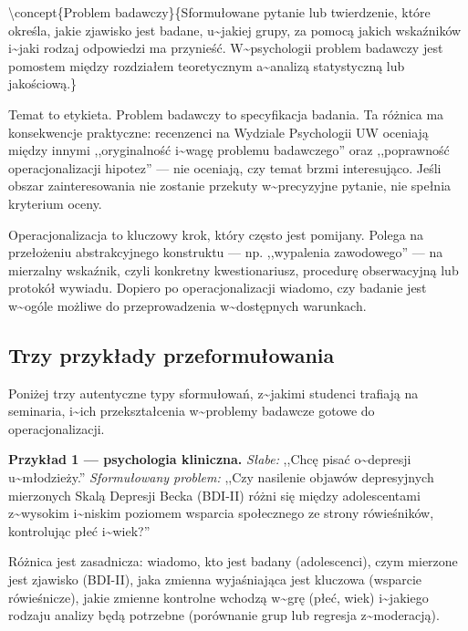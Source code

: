 \documentclass[12pt,a4paper,twoside,openany]{book}
\begin{document}
\textbackslash{}concept\{Problem badawczy\}\{Sformułowane pytanie lub twierdzenie, które określa, jakie zjawisko jest badane, u\textasciitilde{}jakiej grupy, za pomocą jakich wskaźników i\textasciitilde{}jaki rodzaj odpowiedzi ma przynieść. W\textasciitilde{}psychologii problem badawczy jest pomostem między rozdziałem teoretycznym a\textasciitilde{}analizą statystyczną lub jakościową.\}


Temat to etykieta. Problem badawczy to specyfikacja badania. Ta różnica ma konsekwencje praktyczne: recenzenci na Wydziale Psychologii UW oceniają między innymi ,,oryginalność i\textasciitilde{}wagę problemu badawczego'' oraz ,,poprawność operacjonalizacji hipotez'' --- nie oceniają, czy temat brzmi interesująco. Jeśli obszar zainteresowania nie zostanie przekuty w\textasciitilde{}precyzyjne pytanie, nie spełnia kryterium oceny.


Operacjonalizacja to kluczowy krok, który często jest pomijany. Polega na przełożeniu abstrakcyjnego konstruktu --- np. ,,wypalenia zawodowego'' --- na mierzalny wskaźnik, czyli konkretny kwestionariusz, procedurę obserwacyjną lub protokół wywiadu. Dopiero po operacjonalizacji wiadomo, czy badanie jest w\textasciitilde{}ogóle możliwe do przeprowadzenia w\textasciitilde{}dostępnych warunkach.


\subsection{Trzy przykłady przeformułowania}


Poniżej trzy autentyczne typy sformułowań, z\textasciitilde{}jakimi studenci trafiają na seminaria, i\textasciitilde{}ich przekształcenia w\textasciitilde{}problemy badawcze gotowe do operacjonalizacji.


\textbf{Przykład 1 --- psychologia kliniczna.} \textit{Słabe:} ,,Chcę pisać o\textasciitilde{}depresji u\textasciitilde{}młodzieży.'' \textit{Sformułowany problem:} ,,Czy nasilenie objawów depresyjnych mierzonych Skalą Depresji Becka (BDI-II) różni się między adolescentami z\textasciitilde{}wysokim i\textasciitilde{}niskim poziomem wsparcia społecznego ze strony rówieśników, kontrolując płeć i\textasciitilde{}wiek?''


Różnica jest zasadnicza: wiadomo, kto jest badany (adolescenci), czym mierzone jest zjawisko (BDI-II), jaka zmienna wyjaśniająca jest kluczowa (wsparcie rówieśnicze), jakie zmienne kontrolne wchodzą w\textasciitilde{}grę (płeć, wiek) i\textasciitilde{}jakiego rodzaju analizy będą potrzebne (porównanie grup lub regresja z\textasciitilde{}moderacją).
\end{document}
